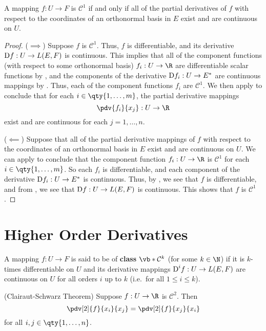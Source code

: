 \begin{theorem}
  A mapping \( f:U\to F \) is \( \mathcal{C}^1 \) if and only if all of the partial derivatives of \( f \) with respect to the coordinates of an orthonormal basis in \( E \) exist and are continuous on \( U \).
\end{theorem}
\begin{proof}
  (\( \implies \)) Suppose \( f \) is \( \mathcal{C}^1 \). Thus, \( f \) is differentiable, and its derivative \( \text{D} f:U\to L(E,F) \) is continuous. This implies that all of the component functions (with respect to some orthonormal basis) \( f_i:U\to\R \) are differentiable scalar functions by , and the components of the derivative \( \text{D} f_i:U\to E^* \) are continuous mappings by . Thus, each of the component functions \( f_i \) are \( \mathcal{C}^1 \). We then apply  to conclude that for each \( i\in\qty{1,\dots,m} \), the partial derivative mappings
  \[ \pdv{f_i}{x_j}:U\to\R \]
  exist and are continuous for each \( j=1,\dots, n \).

  \vspace{3mm}

  (\( \impliedby \)) Suppose that all of the partial derivative mappings of \( f \) with respect to the coordinates of an orthonormal basis in \( E \) exist and are continuous on \( U \). We can apply  to conclude that the component function \( f_i:U\to\R \) is \( \mathcal{C}^1 \) for each \( i\in\qty{1,\dots,m} \). So each \( f_i \) is differentiable, and each component of the derivative \( \text{D} f_i:U\to E^* \) is continuous. Thus, by , we see that \( f \) is differentiable, and from , we see that \( \text{D} f:U\to L(E,F) \) is continuous. This shows that \( f \) is \( \mathcal{C}^1 \).
\end{proof}
\section{Higher Order Derivatives}
\begin{definition}
  A mapping \( f:U\to F \) is said to be of \textbf{class \(\vb*{\mathcal{C}^k}\)} (for some \( k\in\N \)) if it is \( k \)-times differentiable on \( U \) and its derivative mappings \( \text{D}^i f:U\to L(E,F) \) are continuous on \( U \) for all orders \( i \) up to \( k \) (i.e.\ for all \( 1\leq i\leq k \)).
\end{definition}

\begin{theorem}
  (Clairaut-Schwarz Theorem) Suppose \( f:U\to\R \) is \( \mathcal{C}^2 \). Then
  \[ \pdv[2]{f}{x_i}{x_j}=\pdv[2]{f}{x_j}{x_i} \]
  for all \( i,j\in\qty{1,\dots, n} \).
\end{theorem}

